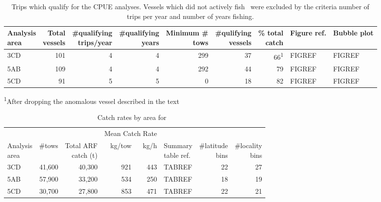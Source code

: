 \begin{table}[b]
\centering
\caption{\label{tab:cpueTripsQualify} Trips which qualify for the CPUE analyses. Vessels which did not actively fish \fishname\ were excluded by the criteria number of trips per year and number of years fishing.}
\begin{tabular}{lrrrrrrll}
\hline
\specialcell{Analysis\\area} & \specialcell{Total\\vessels} & \specialcell{\#qualifying\\trips/year} & \specialcell{\#qualifying\\years} & \specialcell{Minimum \#\\tows} & \specialcell{\#qulifying\\vessels} & \specialcell{\% total\\catch} & Figure ref. & Bubble plot \\
\hline
3CD & 101 & 4 & 4 & 299 & 37 & 66\textsuperscript1 & FIGREF & FIGREF \\
5AB & 109 & 4 & 4 & 292 & 44 &                  79 & FIGREF & FIGREF \\
5CD &  91 & 5 & 5 &   0 & 18 &                  82 & FIGREF & FIGREF \\
\hline
\end{tabular}
\textsuperscript1After dropping the anomalous vessel described in the text
\end{table}

\begin{table}[b]
\centering
\caption{\label{tab:cpueCatchRate} Catch rates by area for \fishname\ }
\begin{tabular}{lrr|rr|lrr}
\hline
    &  &  & \multicolumn{2}{|r|}{Mean Catch Rate} \\
\specialcell{Analysis\\area} & \#tows & \specialcell{Total ARF\\catch (t)} & kg/tow & kg/h & \specialcell{Summary\\table ref.} & \specialcell{\#latitude\\bins} & \specialcell{\#locality\\bins} \\
\hline
3CD & 41,600 & 40,300 & 921 & 443 & TABREF & 22 & 27 \\
5AB & 57,900 & 33,200 & 534 & 250 & TABREF & 18 & 19 \\
5CD & 30,700 & 27,800 & 853 & 471 & TABREF & 22 & 21 \\
\hline
\end{tabular}
\end{table}

